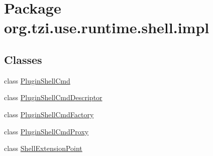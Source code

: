 \hypertarget{namespaceorg_1_1tzi_1_1use_1_1runtime_1_1shell_1_1impl}{\section{Package org.\-tzi.\-use.\-runtime.\-shell.\-impl}
\label{namespaceorg_1_1tzi_1_1use_1_1runtime_1_1shell_1_1impl}
}
\subsection*{Classes}
\begin{DoxyCompactItemize}
\item 
class \hyperlink{classorg_1_1tzi_1_1use_1_1runtime_1_1shell_1_1impl_1_1_plugin_shell_cmd}{Plugin\-Shell\-Cmd}
\item 
class \hyperlink{classorg_1_1tzi_1_1use_1_1runtime_1_1shell_1_1impl_1_1_plugin_shell_cmd_descriptor}{Plugin\-Shell\-Cmd\-Descriptor}
\item 
class \hyperlink{classorg_1_1tzi_1_1use_1_1runtime_1_1shell_1_1impl_1_1_plugin_shell_cmd_factory}{Plugin\-Shell\-Cmd\-Factory}
\item 
class \hyperlink{classorg_1_1tzi_1_1use_1_1runtime_1_1shell_1_1impl_1_1_plugin_shell_cmd_proxy}{Plugin\-Shell\-Cmd\-Proxy}
\item 
class \hyperlink{classorg_1_1tzi_1_1use_1_1runtime_1_1shell_1_1impl_1_1_shell_extension_point}{Shell\-Extension\-Point}
\end{DoxyCompactItemize}
